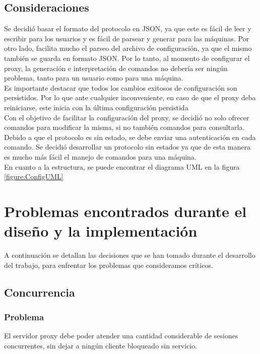 \documentclass[a4paper,10pt]{article}
\begin{document}
\subsection{Consideraciones}
Se decidió basar el formato del protocolo en JSON, ya que este es fácil de leer y escribir para los usuarios y es
fácil de parsear y generar para las máquinas. Por otro lado, facilita mucho el parseo del archivo de configuración,
ya que el mismo también se guarda en formato JSON. Por lo tanto, al momento de configurar el proxy, la generación 
e interpretación de comandos no debería ser ningún problema, tanto para un usuario como para una máquina.\\
Es importante destacar que todos los cambios exitosos de configuración son persistidos. Por lo que ante cualquier
inconveniente, en caso de que el proxy deba reiniciarse, este inicia con la última configuración persistida\\
Con el objetivo de facilitar la configuración del proxy, se decidió no solo ofrecer comandos para modificar la misma,
si no también comandos para consultarla.\\
Debido a que el protocolo es sin estado, se debe enviar una autenticación en cada comando. Se decidió desarrollar
un protocolo sin estados ya que de esta manera es mucho más fácil el manejo de comandos para una máquina.\\
En cuanto a la estructura, se puede encontrar el diagrama UML en la figura \ref{figure:ConfigUML}

\section{Problemas encontrados durante el diseño y la implementación}

A continuación se detallan las decisiones que se han tomado durante el desarrollo del trabajo, para enfrentar los problemas
que consideramos críticos.

\subsection{Concurrencia}
\subsubsection{Problema}
El servidor proxy debe poder atender una cantidad considerable de sesiones concurrentes, sin dejar a ningún cliente
bloqueado sin servicio.
\end{document}
